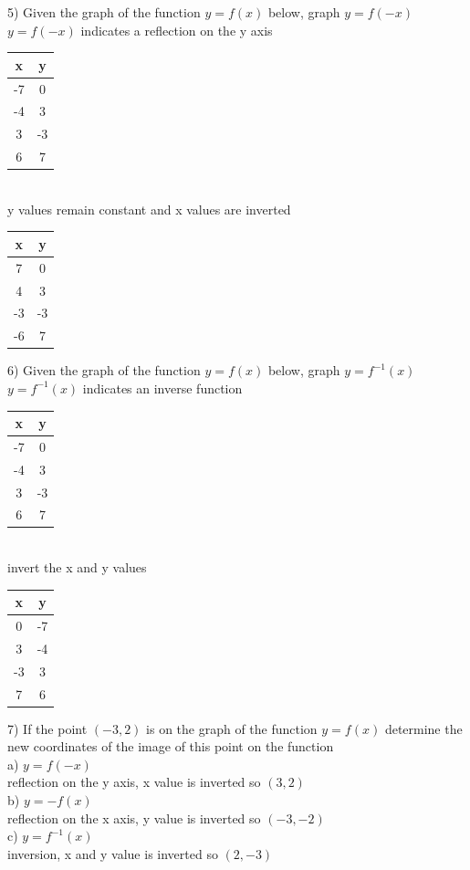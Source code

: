 \documentclass[10pt]{article}
\begin{document}
5) Given the graph of the function \(y = f(x)\) below, graph \(y = f(-x)\) \\
\(y = f(-x)\) indicates a reflection on the y axis \\
\begin{tabular}{|c|c|}
    \hline
    x  & y  \\
    \hline
    -7 & 0  \\
    -4 & 3  \\
    3  & -3 \\
    6  & 7  \\
    \hline
\end{tabular} \\
y values remain constant and x values are inverted \\
\begin{tabular}{|c|c|}
    \hline
    x  & y  \\
    \hline
    7  & 0  \\
    4  & 3  \\
    -3 & -3 \\
    -6 & 7  \\
    \hline
\end{tabular}


6) Given the graph of the function \(y = f(x)\) below, graph \(y = f^{-1}(x)\) \\
\(y = f^{-1}(x)\) indicates an inverse function\\
\begin{tabular}{|c|c|}
    \hline
    x  & y  \\
    \hline
    -7 & 0  \\
    -4 & 3  \\
    3  & -3 \\
    6  & 7  \\
    \hline
\end{tabular} \\
invert the x and y values \\
\begin{tabular}{|c|c|}
    \hline
    x  & y  \\
    \hline
    0  & -7 \\
    3  & -4 \\
    -3 & 3  \\
    7  & 6  \\
    \hline
\end{tabular}
\clearpage


7) If the point \((-3, 2)\) is on the graph of the function \(y = f(x)\) determine the new coordinates of the image of this point on the function \\
a) \(y = f(-x)\) \\
reflection on the y axis, x value is inverted so \((3, 2)\) \\
b) \(y = -f(x)\) \\
reflection on the x axis, y value is inverted so \((-3, -2)\) \\
c) \(y = f^{-1}(x)\) \\
inversion, x and y value is inverted so \((2, -3)\)
\end{document}
